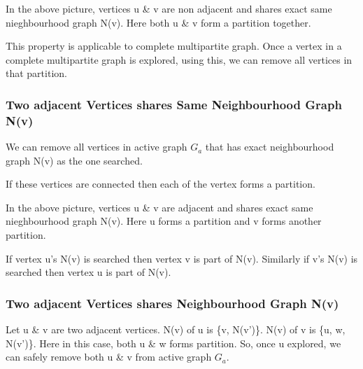 \documentclass[12pt]{article}
\theoremstyle{plain}
\theoremstyle{definition}
\begin{document}
In the above picture, vertices u \& v are non adjacent and shares exact same nieghbourhood graph N(v). Here both u \& v form a partition together.

This property is applicable to complete multipartite graph. Once a vertex in a complete multipartite graph is explored, using this, we can remove all vertices in that partition.

\subsubsection{Two adjacent Vertices shares Same Neighbourhood Graph N(v)}
We can remove all vertices in active graph $G_a$ that has exact neighbourhood graph N(v) as the one searched.

If these vertices are connected then each of the vertex forms a partition.

\begin{center}
\end{center}

In the above picture, vertices u \& v are adjacent and shares exact same nieghbourhood graph N(v). Here u forms a partition and v forms another partition.

If vertex u's N(v) is searched then vertex v is part of N(v). Similarly if v's N(v) is searched then vertex u is part of N(v).

\subsubsection{Two adjacent Vertices shares Neighbourhood Graph N(v)}

Let u \& v are two adjacent vertices. N(v) of u is \{v, N(v')\}. N(v) of v is \{u, w, N(v')\}. Here in this case, both u \& w forms partition. So, once u explored, we can safely remove both u \& v from active graph $G_a$.
\end{document}
